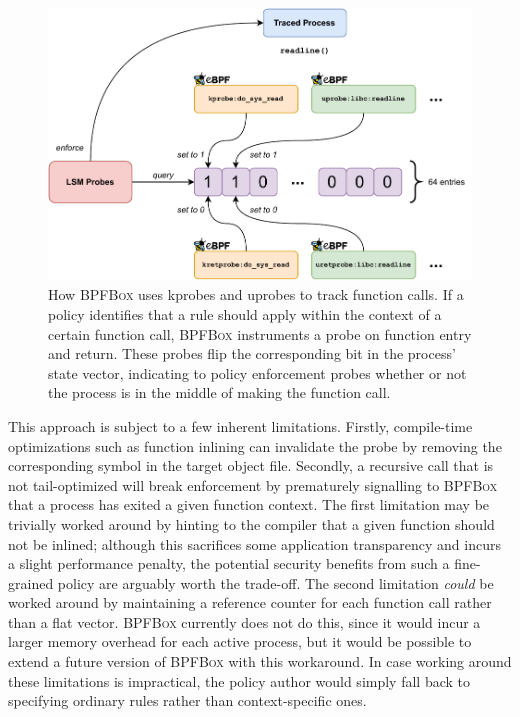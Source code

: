 \documentclass[
  fontsize=12pt,
  titlepage=firstiscover,
  paper=letter,
oneside,
  cleardoublepage=plain,
  parskip=half-,
  DIV=10,
  parindent,
  appendixprefix,
  chapterprefix,
  listof=totoc,
]{scrbook}
\newcommand{\bpfbox}{\textsc{BPFBox}}
\begin{document}
\begin{figure}[p]
  \centering
  \includegraphics[width=1\linewidth]{figs/bpfbox/function-calls.pdf}
  \caption[How \bpfbox{} tracks function calls]{
    How \bpfbox{} uses kprobes and uprobes to track function calls.  If a policy
    identifies that a rule should apply within the context of a certain function call,
    \bpfbox{} instruments a probe on function entry and return. These probes flip the
    corresponding bit in the process' state vector, indicating to policy enforcement
    probes whether or not the process is in the middle of making the function call.
  }\label{fig:bpfbox-function-calls}
\end{figure}

This approach is subject to a few inherent limitations.  Firstly, compile-time
optimizations such as function inlining can invalidate the probe by removing the
corresponding symbol in the target object file. Secondly, a recursive call that is not
tail-optimized will break enforcement by prematurely signalling to \bpfbox{} that
a process has exited a given function context.  The first limitation may be trivially
worked around by hinting to the compiler that a given function should not be inlined;
although this sacrifices some application transparency and incurs a slight performance
penalty, the potential security benefits from such a fine-grained policy are arguably
worth the trade-off.  The second limitation \textit{could} be worked around by maintaining
a reference counter for each function call rather than a flat vector. \bpfbox{} currently
does not do this, since it would incur a larger memory overhead for each active process,
but it would be possible to extend a future version of \bpfbox{} with this workaround. In
case working around these limitations is impractical, the policy author would simply fall
back to specifying ordinary rules rather than context-specific ones.
\end{document}

